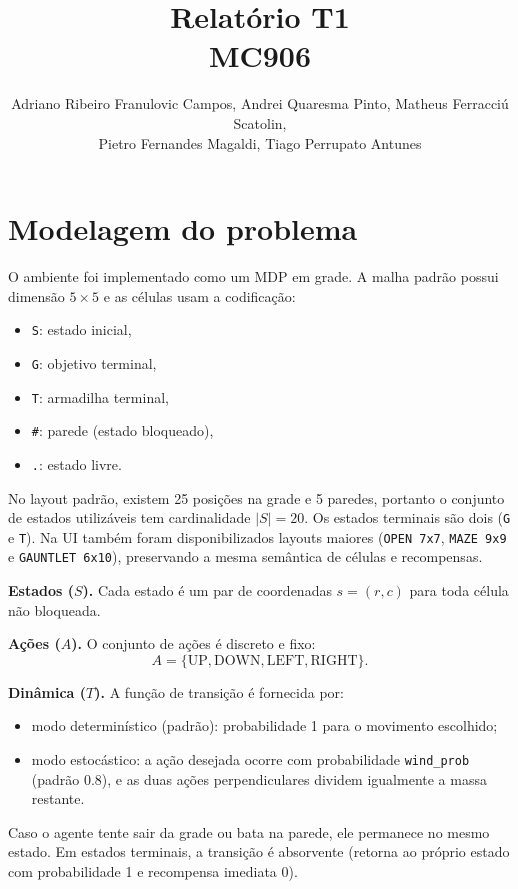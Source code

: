 \documentclass[a4paper,11pt]{article}
\title{\textbf{Relatório T1} \\ \large MC906}
\author{
    Adriano Ribeiro Franulovic Campos,
    Andrei Quaresma Pinto,
    Matheus Ferracciú Scatolin,\\
    Pietro Fernandes Magaldi,
    Tiago Perrupato Antunes
}
\date{}
\begin{document}
\maketitle

\section{Modelagem do problema}

O ambiente foi implementado como um MDP em grade. A malha padrão possui dimensão $5\times5$ e as células usam a codificação:
\begin{itemize}
    \item \texttt{S}: estado inicial,
    \item \texttt{G}: objetivo terminal,
    \item \texttt{T}: armadilha terminal,
    \item \texttt{\#}: parede (estado bloqueado),
    \item \texttt{.}: estado livre.
\end{itemize}

No layout padrão, existem 25 posições na grade e 5 paredes, portanto o conjunto de estados utilizáveis tem cardinalidade $|S|=20$. Os estados terminais são dois (\texttt{G} e \texttt{T}). Na UI também foram disponibilizados layouts maiores (\texttt{OPEN 7x7}, \texttt{MAZE 9x9} e \texttt{GAUNTLET 6x10}), preservando a mesma semântica de células e recompensas.

\textbf{Estados ($S$).} Cada estado é um par de coordenadas $s=(r,c)$ para toda célula não bloqueada.

\textbf{Ações ($A$).} O conjunto de ações é discreto e fixo:
\[
A=\{\text{UP},\text{DOWN},\text{LEFT},\text{RIGHT}\}.
\]

\textbf{Dinâmica ($T$).} A função de transição é fornecida por:
\begin{itemize}
    \item modo determinístico (padrão): probabilidade 1 para o movimento escolhido;
    \item modo estocástico: a ação desejada ocorre com probabilidade \texttt{wind\_prob} (padrão 0.8), e as duas ações perpendiculares dividem igualmente a massa restante.
\end{itemize}

Caso o agente tente sair da grade ou bata na parede, ele permanece no mesmo estado. Em estados terminais, a transição é absorvente (retorna ao próprio estado com probabilidade 1 e recompensa imediata 0).
\end{document}
